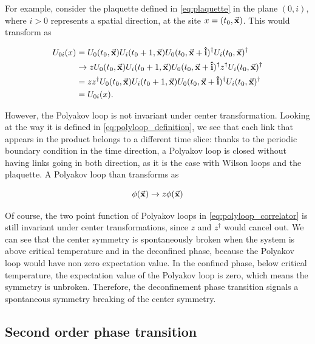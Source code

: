 \documentclass[reqno,12pt]{article}
\numberwithin{equation}{section}
\begin{document}
For example, consider the plaquette defined in \eqref{eq:plaquette} in the plane $(0, i)$, where $i > 0$ represents a spatial
direction, at the site $x = (t_0, \va{x})$. This would transform as

\begin{equation} \label{eq:center_trans}
	\begin{aligned}
	U_{0i}(x) &= U_0(t_0, \va{x}) U_i(t_0 + 1, \va{x}) U_0(t_0, \va{x} + \vu{i})^\dagger U_i(t_0, \va{x})^\dagger \\
	&\rightarrow z U_0(t_0, \va{x}) U_i(t_0 + 1, \va{x}) U_0(t_0, \va{x} + \vu{i})^\dagger z^\dagger U_i(t_0, \va{x})^\dagger \\
	&= z z^\dagger U_0(t_0, \va{x}) U_i(t_0 + 1, \va{x}) U_0(t_0, \va{x} + \vu{i})^\dagger U_i(t_0, \va{x})^\dagger \\
	&= U_{0i}(x).
	\end{aligned}
\end{equation}

However, the Polyakov loop is not invariant under center transformation. Looking at the way it is defined in
\eqref{eq:polyloop_definition}, we see that each link that appears in the product belongs to a different time slice: thanks
to the periodic boundary condition in the time direction, a Polyakov loop is closed without having links going in both direction,
as it is the case with Wilson loops and the plaquette. A Polyakov loop than transforms as

\begin{equation} \label{eq:polyloop_center_trans}
	\phi(\va{x}) \rightarrow z \phi(\va{x})
\end{equation}

Of course, the two point function of Polyakov loops in \eqref{eq:polyloop_correlator} is still invariant under center
transformations, since $z$ and $z^\dagger$ would cancel out. We can see that the center symmetry is spontaneously broken
when the system is above critical temperature and in the deconfined phase, because the Polyakov loop would have non zero 
expectation value. In the confined phase, below critical temperature, the expectation value of the Polyakov loop
is zero, which means the symmetry is unbroken. Therefore, the deconfinement phase transition signals a spontaneous symmetry
breaking of the center symmetry.  

\subsection{Second order phase transition} \label{phase_transition}
\end{document}
